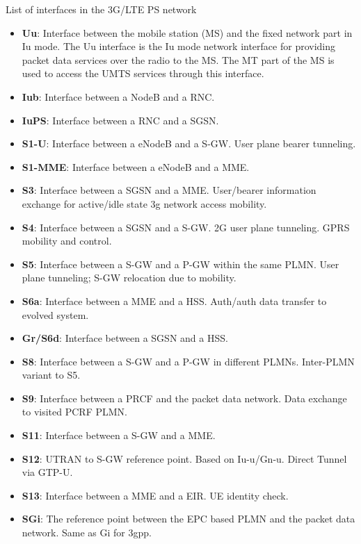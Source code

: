 List of interfaces in the 3G/LTE PS network
\begin{itemize}
\item \textbf{Uu}: Interface between the mobile station (MS) and the fixed network part in Iu mode. The Uu interface is the Iu mode network interface for providing packet data services over the radio to the MS. The MT part of the MS is used to access the UMTS services through this interface.
\item \textbf{Iub}: Interface between a NodeB and a RNC.
\item \textbf{IuPS}: Interface between a RNC and a SGSN.

\item \textbf{S1-U}: Interface between a eNodeB and a S-GW. User plane bearer tunneling.
\item \textbf{S1-MME}: Interface between a eNodeB and a MME.
\item \textbf{S3}: Interface between a SGSN and a MME. User/bearer information exchange for active/idle state 3g network access mobility.
\item \textbf{S4}: Interface between a SGSN and a S-GW.	 2G user plane tunneling. GPRS mobility and control.
\item \textbf{S5}: Interface between a S-GW and a P-GW within the same PLMN. User plane tunneling; S-GW relocation due to mobility.
\item \textbf{S6a}: Interface between a MME and a HSS. Auth/auth data transfer to evolved system.
\item \textbf{Gr/S6d}: Interface between a SGSN and a HSS. 
\item \textbf{S8}: Interface between a S-GW and a P-GW in different PLMNs. Inter-PLMN variant to S5.
\item \textbf{S9}: Interface between a PRCF and the packet data network. Data exchange to visited PCRF PLMN.
\item \textbf{S11}: Interface between a S-GW and a MME.
\item \textbf{S12}: UTRAN to S-GW reference point. Based on Iu-u/Gn-u. Direct Tunnel via GTP-U.
\item \textbf{S13}: Interface between a MME and a EIR. UE identity check.
\item \textbf{SGi}: The reference point between the EPC based PLMN and the packet data network. Same as Gi for 3gpp.


\end{itemize}
